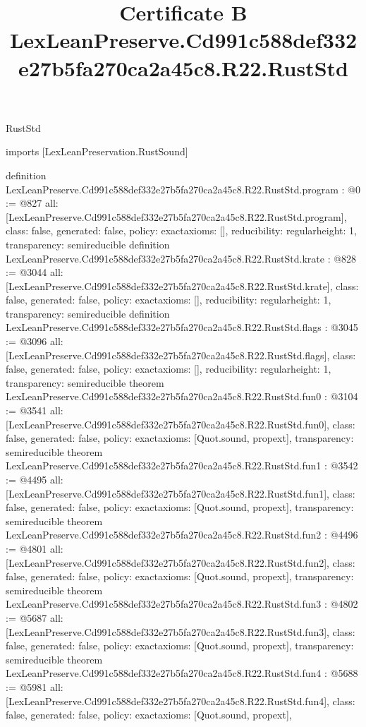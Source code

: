 \begin{lexlean}{RustStd}
\title{Certificate B LexLeanPreserve.Cd991c588def332e27b5fa270ca2a45c8.R22.RustStd}
\begin{coremodule}
imports [LexLeanPreservation.RustSound]

definition LexLeanPreserve.Cd991c588def332e27b5fa270ca2a45c8.R22.RustStd.program : @0 := @827 {
  all: [LexLeanPreserve.Cd991c588def332e27b5fa270ca2a45c8.R22.RustStd.program],
  class: false,
  generated: false,
  policy: exact{axioms: []},
  reducibility: regular{height: 1},
  transparency: semireducible
}
definition LexLeanPreserve.Cd991c588def332e27b5fa270ca2a45c8.R22.RustStd.krate : @828 := @3044 {
  all: [LexLeanPreserve.Cd991c588def332e27b5fa270ca2a45c8.R22.RustStd.krate],
  class: false,
  generated: false,
  policy: exact{axioms: []},
  reducibility: regular{height: 1},
  transparency: semireducible
}
definition LexLeanPreserve.Cd991c588def332e27b5fa270ca2a45c8.R22.RustStd.flags : @3045 := @3096 {
  all: [LexLeanPreserve.Cd991c588def332e27b5fa270ca2a45c8.R22.RustStd.flags],
  class: false,
  generated: false,
  policy: exact{axioms: []},
  reducibility: regular{height: 1},
  transparency: semireducible
}
theorem LexLeanPreserve.Cd991c588def332e27b5fa270ca2a45c8.R22.RustStd.fun0 : @3104 := @3541 {
  all: [LexLeanPreserve.Cd991c588def332e27b5fa270ca2a45c8.R22.RustStd.fun0],
  class: false,
  generated: false,
  policy: exact{axioms: [Quot.sound, propext]},
  transparency: semireducible
}
theorem LexLeanPreserve.Cd991c588def332e27b5fa270ca2a45c8.R22.RustStd.fun1 : @3542 := @4495 {
  all: [LexLeanPreserve.Cd991c588def332e27b5fa270ca2a45c8.R22.RustStd.fun1],
  class: false,
  generated: false,
  policy: exact{axioms: [Quot.sound, propext]},
  transparency: semireducible
}
theorem LexLeanPreserve.Cd991c588def332e27b5fa270ca2a45c8.R22.RustStd.fun2 : @4496 := @4801 {
  all: [LexLeanPreserve.Cd991c588def332e27b5fa270ca2a45c8.R22.RustStd.fun2],
  class: false,
  generated: false,
  policy: exact{axioms: [Quot.sound, propext]},
  transparency: semireducible
}
theorem LexLeanPreserve.Cd991c588def332e27b5fa270ca2a45c8.R22.RustStd.fun3 : @4802 := @5687 {
  all: [LexLeanPreserve.Cd991c588def332e27b5fa270ca2a45c8.R22.RustStd.fun3],
  class: false,
  generated: false,
  policy: exact{axioms: [Quot.sound, propext]},
  transparency: semireducible
}
theorem LexLeanPreserve.Cd991c588def332e27b5fa270ca2a45c8.R22.RustStd.fun4 : @5688 := @5981 {
  all: [LexLeanPreserve.Cd991c588def332e27b5fa270ca2a45c8.R22.RustStd.fun4],
  class: false,
  generated: false,
  policy: exact{axioms: [Quot.sound, propext]},
}
\end{coremodule}
\end{lexlean}
